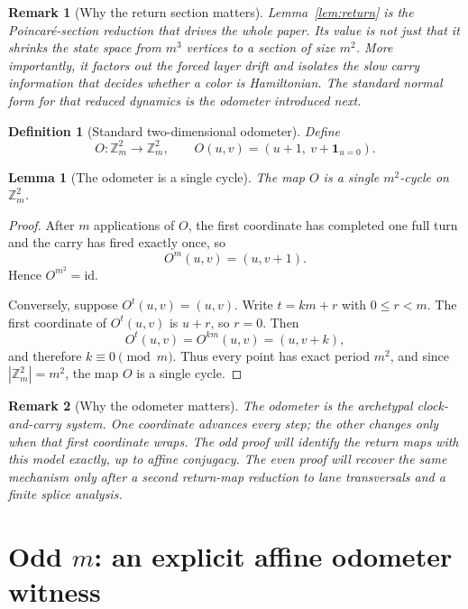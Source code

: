 \documentclass[11pt]{article}
\newtheorem{lemma}{Lemma}
\newtheorem{definition}{Definition}
\newtheorem{remark}{Remark}
\newcommand{\Zm}{\mathbb Z_m}
\begin{document}
\begin{remark}[Why the return section matters]\label{rem:return-odometer}
Lemma~\ref{lem:return} is the Poincar\'e-section reduction that drives the whole paper.
Its value is not just that it shrinks the state space from $m^3$ vertices to a section of size $m^2$.
More importantly, it factors out the forced layer drift and isolates the slow carry information that decides whether a color is Hamiltonian.
The standard normal form for that reduced dynamics is the odometer introduced next.
\end{remark}

\begin{definition}[Standard two-dimensional odometer]
Define
\[
O:\Zm^2\to \Zm^2,\qquad O(u,v)=(u+1,\ v+\mathbf 1_{u=0}).
\]
\end{definition}

\begin{lemma}[The odometer is a single cycle]\label{lem:odometer}
The map $O$ is a single $m^2$-cycle on $\Zm^2$.
\end{lemma}

\begin{proof}
After $m$ applications of $O$, the first coordinate has completed one full turn and the carry has fired exactly once, so
\[
O^m(u,v)=(u,v+1).
\]
Hence $O^{m^2}=\mathrm{id}$.

Conversely, suppose $O^t(u,v)=(u,v)$.
Write $t=km+r$ with $0\le r<m$.
The first coordinate of $O^t(u,v)$ is $u+r$, so $r=0$.
Then
\[
O^t(u,v)=O^{km}(u,v)=(u,v+k),
\]
and therefore $k\equiv 0\pmod m$.
Thus every point has exact period $m^2$, and since $|\Zm^2|=m^2$, the map $O$ is a single cycle.
\end{proof}

\begin{remark}[Why the odometer matters]
The odometer is the archetypal clock-and-carry system.
One coordinate advances every step; the other changes only when that first coordinate wraps.
The odd proof will identify the return maps with this model exactly, up to affine conjugacy.
The even proof will recover the same mechanism only after a second return-map reduction to lane transversals and a finite splice analysis.
\end{remark}


\section{Odd $m$: an explicit affine odometer witness}\label{sec:affine}
\end{document}
